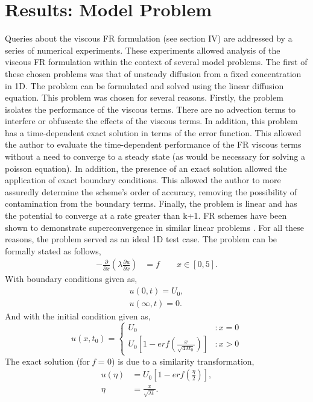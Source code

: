 \section{Results: Model Problem}

Queries about the viscous FR formulation (see section IV) are addressed by a series of numerical experiments. These experiments allowed analysis of the viscous FR formulation within the context of several model problems. The first of these chosen problems was that of unsteady diffusion from a fixed concentration in 1D.  The problem can be formulated and solved using the linear diffusion equation. This problem was chosen for several reasons. Firstly, the problem isolates the performance of the viscous terms. There are no advection terms to interfere or obfuscate the effects of the viscous terms. In addition, this problem has a time-dependent exact solution in terms of the error function. This allowed the author to evaluate the time-dependent performance of the FR viscous terms without a need to converge to a steady state (as would be necessary for solving a poisson equation). In addition, the presence of an exact solution allowed the application of exact boundary conditions. This allowed the author to more assuredly determine the scheme's order of accuracy, removing the possibility of contamination from the boundary terms. Finally, the problem is linear and has the potential to converge at a rate greater than k+1. FR schemes have been shown to demonstrate superconvergence in similar linear problems \cite{Huynh09}. For all these reasons, the problem served as an ideal 1D test case. The problem can be formally stated as follows,
%
\begin{align*}
	- \frac {\partial}{\partial x} \left(\lambda \frac{\partial u}{\partial x} \right) &= f  \qquad x \in [0,5]. 	\tag{39}
\end{align*}
%
With boundary conditions given as,
%
\begin{align*}
	u(0,t) = U_{0},  \tag{40}  \\ 
	u(\infty, t) = 0.
\end{align*}
%
And with the initial condition given as,
%
\begin{displaymath}
	u(x, t_{0}) = \left \{
		\begin{array}{lr}
			U_{0} & : x = 0  \tag{41} \\
			U_{0} \left[1-erf(\frac{x}{\sqrt{4\lambda t_{0}}}) \right] & : x > 0
		\end{array}
		\right .
\end{displaymath}
%
\vspace{0.1 in}
The exact solution (for \emph{f} = 0) is due to a similarity transformation,
%
\begin{align*}
	u(\eta) & = U_{0} \left[1-erf(\frac{\eta}{2}) \right],  \tag{42} \\
	\eta & = \frac{x}{ \sqrt{ \lambda t }}.
\end{align*}

